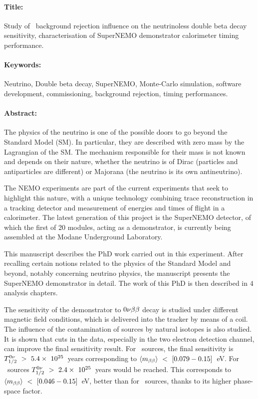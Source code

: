 \begin{mdframed}[linecolor=Prune,linewidth=1]
\vspace{-.25cm}
\paragraph*{Title:} Study of \Tl\ background rejection influence on the neutrinoless double beta decay sensitivity, characterisation of SuperNEMO demonstrator calorimeter timing performance.

\begin{footnotesize}
\vspace{-.25cm}
\paragraph*{Keywords:} Neutrino, Double beta decay, SuperNEMO, Monte-Carlo simulation, software development, commissioning, background rejection, timing performances.

\vspace{-.5cm}
\begin{multicols}{2}
\paragraph*{Abstract:} The physics of the neutrino is one of the possible doors to go beyond the Standard Model (SM).
In particular, they are described with zero mass by the Lagrangian of the SM.
The mechanism responsible for their mass is not known and depends on their nature, whether the neutrino is of Dirac (particles and antiparticles are different) or Majorana (the neutrino is its own antineutrino).

The NEMO experiments are part of the current experiments that seek to highlight this nature, with a unique technology combining trace reconstruction in a tracking detector and measurement of energies and times of flight in a calorimeter.
The latest generation of this project is the SuperNEMO detector, of which the first of 20 modules, acting as a demonstrator, is currently being assembled at the Modane Underground Laboratory.

This manuscript describes the PhD work carried out in this experiment.
After recalling certain notions related to the physics of the Standard Model and beyond, notably concerning neutrino physics, the manuscript presents the SuperNEMO demonstrator in detail.
The work of this PhD is then described in $4$ analysis chapters.

The sensitivity of the demonstrator to $0\nu\beta\beta$ decay is studied under different magnetic field conditions, which is delivered into the tracker by means of a coil.
The influence of the contamination of sources by natural isotopes is also studied.
It is shown that cuts in the data, especially in the two electron detection channel, can improve the final sensitivity result.
For \Se\ sources, the final sensitivity is $T_{1/2}^{0\nu}~>~5.4\times~10^{25}$~years corresponding to $\langle m_{\beta\beta}\rangle~<~[0.079-0.15]$~eV.
For \Nd\ sources $T_{1/2}^{0\nu}~>~2.4\times~10^{25}$~years would be reached.
This corresponds to $\langle m_{\beta\beta}\rangle~<~[0.046-0.15]$~eV, better than for \Se\ sources, thanks to its higher phase-space factor.


\end{multicols}
\end{footnotesize}
\end{mdframed}
